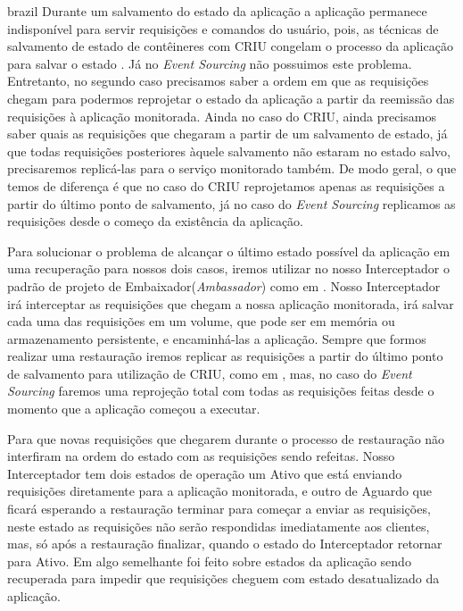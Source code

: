 \begin{otherlanguage*}{brazil}
Durante um salvamento do estado da aplicação a aplicação permanece indisponível para
servir requisições e comandos do usuário, pois, as técnicas de salvamento de estado
de contêineres com CRIU congelam o processo da aplicação para salvar o estado
\cite{vayghan2021kubernetes}. Já no \textit{Event Sourcing} não possuimos este problema.
Entretanto, no segundo caso precisamos saber a ordem em que as requisições chegam para
podermos reprojetar o estado da aplicação a partir da reemissão das requisições à aplicação
monitorada. Ainda no caso do CRIU, ainda precisamos saber quais as requisições que chegaram
a partir de um salvamento de estado, já que todas requisições posteriores àquele salvamento
não estaram no estado salvo, precisaremos replicá-las para o serviço monitorado também. De
modo geral, o que temos de diferença é que no caso do CRIU reprojetamos apenas as requisições
a partir do último ponto de salvamento, já no caso do \textit{Event Sourcing} replicamos
as requisições desde o começo da existência da aplicação.

Para solucionar o problema de alcançar o último estado possível da aplicação em uma
recuperação para nossos dois casos, iremos utilizar no nosso Interceptador o padrão de projeto
de Embaixador(\textit{Ambassador}) como em \cite{muller2022architecture}. Nosso Interceptador
irá interceptar as requisições que chegam a nossa aplicação monitorada, irá salvar cada uma
das requisições em um volume, que pode ser em memória ou armazenamento persistente, e
encaminhá-las a aplicação. Sempre que formos realizar uma restauração iremos replicar as
requisições a partir do último ponto de salvamento para utilização de CRIU, como em 
\cite{muller2022architecture}, mas, no caso do \textit{Event Sourcing} faremos uma
reprojeção total com todas as requisições feitas desde o momento que a aplicação começou a
executar.

Para que novas requisições que chegarem durante o processo de restauração não interfiram na
ordem do estado com as requisições sendo refeitas. Nosso Interceptador tem dois estados de
operação um Ativo que está enviando requisições diretamente para a aplicação monitorada, e
outro de Aguardo que ficará esperando a restauração terminar para começar a enviar as
requisições, neste estado as requisições não serão respondidas imediatamente aos clientes,
mas, só após a restauração finalizar, quando o estado do Interceptador retornar para Ativo.
Em \cite{vayghan2021kubernetes} algo semelhante foi feito sobre estados da aplicação sendo
recuperada para impedir que requisições cheguem com estado desatualizado da aplicação.



\end{otherlanguage*}
